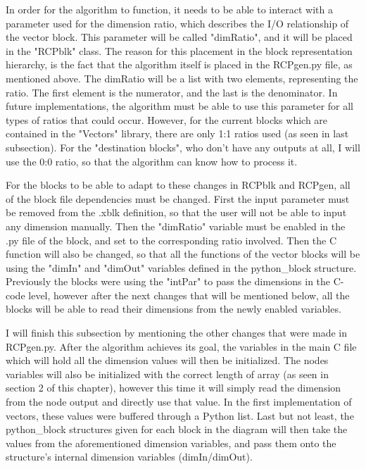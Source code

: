 \quad In order for the algorithm to function, it needs to be able to interact with a parameter used for the
dimension ratio, which describes the I/O relationship of the vector block. This parameter will be called
"dimRatio", and it will be placed in the "RCPblk" class. The reason for this placement in the block
representation hierarchy, is the fact that the algorithm itself is placed in the RCPgen.py file, as mentioned
above. The dimRatio will be a list with two elements, representing the ratio. The first element is the 
numerator, and the last is the denominator. In future implementations, the algorithm must be able to use this
parameter for all types of ratios that could occur. However, for the current blocks which are contained in
the "Vectors" library, there are only 1:1 ratios used (as seen in last subsection). For the "destination
blocks", who don't have any outputs at all, I will use the 0:0 ratio, so that the algorithm can know how to
process it.

\quad For the blocks to be able to adapt to these changes in  RCPblk and RCPgen, all of the block file
dependencies must be changed. First the input parameter must be removed from the .xblk definition, so that
the user will not be able to input any dimension manually. Then the "dimRatio" variable must be enabled in
the .py file of the block, and set to the corresponding ratio involved. Then the C function will also be
changed, so that all the functions of the vector blocks will be using the "dimIn" and "dimOut" variables
defined in the python_block structure. Previously the blocks were using the "intPar" to pass the dimensions
in the C-code level, however after the next changes that will be mentioned below, all the blocks will be able
to read their dimensions from the newly enabled variables.

\quad I will finish this subsection by mentioning the other changes that were made in RCPgen.py. After the
algorithm achieves its goal, the variables in the main C file which will hold all the dimension values will
then be initialized. The nodes variables will also be initialized with the correct length of array (as seen
in section 2 of this chapter), however this time it will simply read the dimension from the node output
and directly use that value. In the first implementation of vectors, these values were buffered through a
Python list. Last but not least, the python_block structures given for each block in the diagram will then
take the values from the aforementioned dimension variables, and pass them onto the structure's internal
dimension variables (dimIn/dimOut).


